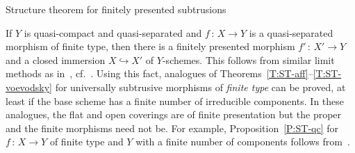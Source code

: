 \documentclass[a4paper,twoside,11pt]{amsart}[2009/07/02] %
\newcommand{\pref}[1]{\eqref{#1}}
\newcommand{\inj}{\hookrightarrow}
\newcommand{\map}[3]{#1\,:\, #2\rightarrow #3}
\begin{document}
\begin{section}{Structure theorem for finitely presented subtrusions}
\begin{remark}\label{R:st-non-fp}
If $Y$ is quasi-compact and quasi-separated and $\map{f}{X}{Y}$ is a
quasi-separated morphism of finite type, then there is a finitely presented
morphism $\map{f'}{X'}{Y}$ and a closed immersion $X\inj X'$ of
$Y$-schemes. This follows from similar limit methods as
in~\cite[App.~C]{thomason-trobaugh}, cf.\ \cite[Thm.~4.3]{conrad_nagata}.
Using this fact, analogues of Theorems~\pref{T:ST-aff}--\pref{T:ST-voevodsky}
for universally subtrusive morphisms of \emph{finite type} can be proved, at
least if the base scheme has a finite number of irreducible components. In
these analogues, the flat and open coverings are of finite presentation but the
proper and the finite morphisms need not be. For example,
Proposition~\pref{P:ST-qc} for $\map{f}{X}{Y}$ of finite type and $Y$ with a
finite number of components follows from~\cite[Thm.~3.4.6]{raynaud-gruson}.
\end{remark}

\end{section}

\end{document}
